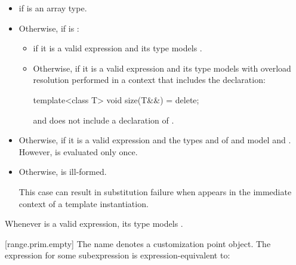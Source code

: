 \begin{itemize}
\item
   if  is an array
  type.

\item
  Otherwise, if
  is :
  \begin{itemize}
  \item
    if it is a valid expression and its type 
    models .

  \item
    Otherwise, 
    if it is a valid expression and its type 
    models 
    with overload resolution performed in a context that includes
    the declaration:
    \begin{codeblock}
    template<class T> void size(T&&) = delete;
    \end{codeblock}

    and does not include a declaration of .
  \end{itemize}

\item
  Otherwise, 
  if it is a valid expression and
  the types  and  of  and
   model
   and
  .
  However,  is evaluated only once.

\item
  Otherwise,  is ill-formed.
  \begin{note}
  This case can result in substitution failure when 
  appears in the immediate context of a template instantiation.
  \end{note}
\end{itemize}

\pnum
\begin{note}
Whenever  is a valid expression, its
type models .
\end{note}

[range.prim.empty]{}
\pnum
The name  denotes a customization point
object. The expression
 for some subexpression  is
expression-equivalent to:


